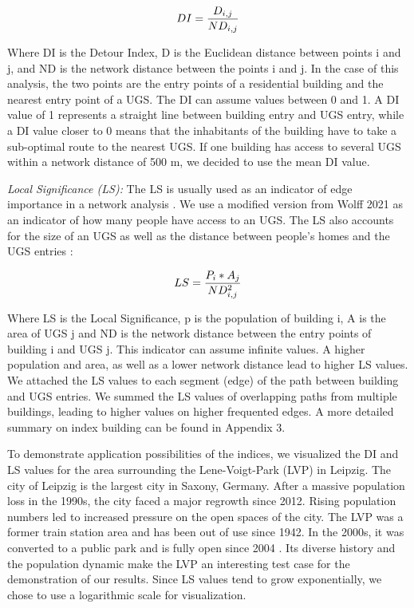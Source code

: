 \documentclass[10pt]{article}
\begin{document}
\begin{equation}
\centering
\large{DI = \frac{D_{i,j}}{ND_{i,j}}}
\end{equation}

Where DI is the Detour Index, D is the Euclidean distance between points i and j, and ND is the network distance between the points i and j.
In the case of this analysis, the two points are the entry points of a residential building and the nearest entry point of a UGS.
The DI can assume values between 0 and 1.
A DI value of 1 represents a straight line between building entry and UGS entry, while a DI value closer to 0 means that the inhabitants of the building have to take a sub-optimal route to the nearest UGS.
If one building has access to several UGS within a network distance of 500 m, we decided to use the mean DI value.

\textit{Local Significance (LS):} The LS is usually used as an indicator of edge importance in a network analysis \citep{Esch.2014}.
We use a modified version from Wolff 2021 as an indicator of how many people have access to an UGS.
The LS also accounts for the size of an UGS as well as the distance between people’s homes and the UGS entries \citep{Wolff.2021}:

\begin{equation}
\centering
\large{LS = \frac{P_{i} * A_{j}}{ND^2_{i,j}}}
\end{equation}

Where LS is the Local Significance, p is the population of building i, A is the area of UGS j and ND is the network distance between the entry points of building i and UGS j.
This indicator can assume infinite values.
A higher population and area, as well as a lower network distance lead to higher LS values.
We attached the LS values to each segment (edge) of the path between building and UGS entries.
We summed the LS values of overlapping paths from multiple buildings, leading to higher values on higher frequented edges.
A more detailed summary on index building can be found in Appendix 3.

To demonstrate application possibilities of the indices, we visualized the DI and LS values for the area surrounding the Lene-Voigt-Park (LVP) in Leipzig.
The city of Leipzig is the largest city in Saxony, Germany. After a massive population loss in the 1990s, the city faced a major regrowth since 2012. Rising population numbers led to increased pressure on the open spaces of the city.
The LVP was a former train station area and has been out of use since 1942.
In the 2000s, it was converted to a public park and is fully open since 2004 \citep{Wolff.2017, StadtLeipzig.2022}.
Its diverse history and the population dynamic make the LVP an interesting test case for the demonstration of our results.
Since LS values tend to grow exponentially, we chose to use a logarithmic scale for visualization.
\end{document}
